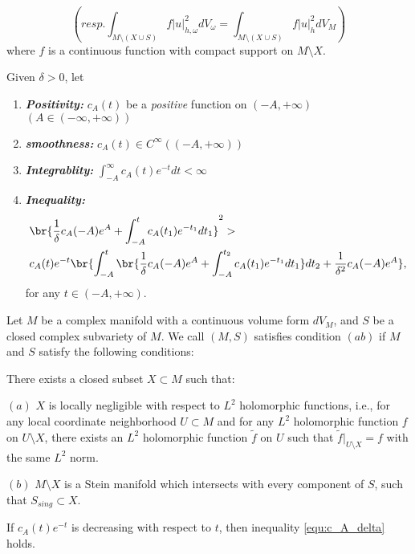 \documentclass[twoside,openany,12pt]{beautynote}
\newcommand{\itbf}[1]{\textbf{\itshape #1}}\newcommand{\supp}{\operatorname{Supp}}\newcommand{\xu}{\sqrt{-1}}
\begin{document}
\begin{equation}
\label{equ:9.2}
(resp.
\int_{M\setminus(X\cup S)}f|u|^{2}_{h,\omega}dV_{\omega}
=\int_{M\setminus(X\cup S)}f|u|^{2}_{h}dV_{M})
\end{equation}
where $f$ is a continuous function with compact support on $M\setminus X$.


Given $\delta>0$, let
\begin{enumerate}
  \item \itbf{Positivity:} $c_{A}(t)$ be a \textit{positive} function on
$(-A,+\infty)$ $(A\in(-\infty,+\infty))$
\item \itbf{smoothness:} $c_{A}(t)\in C^{\infty}((-A,+\infty))$
\item \itbf{Integrablity:} $\int_{-A}^{\infty}c_{A}(t)e^{-t}dt<\infty$
\item \itbf{Inequality:} \begin{equation}
\label{equ:c_A_delta}
\begin{split}
&\br{\frac{1}{\delta}c_{A}(-A)e^{A}+\int_{-A}^{t}c_{A}(t_{1})e^{-t_{1}}dt_{1}}^{2}>\\&c_{A}(t)e^{-t}
\br{\int_{-A}^{t}\br{\frac{1}{\delta}c_{A}(-A)e^{A}+\int_{-A}^{t_{2}}c_{A}(t_{1})e^{-t_{1}}dt_{1}}
dt_{2}+\frac{1}{\delta^{2}}c_{A}(-A)e^{A}},
\end{split}
\end{equation}
for any $t\in(-A,+\infty)$.
\end{enumerate}

\begin{definition}[Condition (ab)]
  Let $M$ be a complex manifold with a continuous volume form
  $dV_{M}$, and $S$ be a closed complex subvariety of $M$. We call
  $(M,S)$ satisfies condition $(ab)$ if $M$ and $S$ satisfy the
  following conditions:
  
  There exists a closed subset $X\subset M$ such that:
  
  $(a)$ $X$ is locally negligible with respect to $L^2$ holomorphic
  functions, i.e., for any local coordinate neighborhood $U\subset M$
  and for any $L^2$ holomorphic function $f$ on $U\setminus X$, there
  exists an $L^2$ holomorphic function $\tilde{f}$ on $U$ such that
  $\tilde{f}|_{U\setminus X}=f$ with the same $L^{2}$ norm.
  
  $(b)$ $M\setminus X$ is a Stein manifold which intersects with every component of $S$,
  such that $S_{sing}\subset X$.
  \end{definition}

If $c_{A}(t)e^{-t}$ is decreasing with respect to $t$, then
inequality \ref{equ:c_A_delta} holds.
\end{document}
